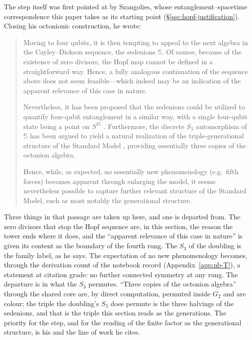 The step itself was first pointed at by Szangolies, whose entanglement--spacetime correspondence
this paper takes as its starting point (\S\ref{sec:hopf-justification}). Closing his octonionic
construction, he wrote:
\begin{quotation}
Moving to four qubits, it is then tempting to appeal to the next algebra in the Cayley--Dickson
sequence, the sedenions $\mathbb{S}$. Of course, because of the existence of zero divisors, the Hopf
map cannot be defined in a straightforward way. Hence, a fully analogous continuation of the
sequence above does not seem feasible---which indeed may be an indication of the apparent relevance
of this case in nature.

Nevertheless, it has been proposed that the sedenions could be utilized to quantify four-qubit
entanglement in a similar way, with a single four-qubit state being a point on $S^{31}$
\autocite{pinillaluthra2009hopf}. Furthermore, the discrete $S_{3}$ automorphism of $\mathbb{S}$ has
been argued to yield a natural realization of the triple-generational structure of the Standard
Model \autocite{gresnigtgourlayvarma2023three,gourlaygresnigt2024algebraic,tangtang2023unified},
providing essentially three copies of the octonion algebra.

Hence, while, as expected, no essentially new phenomenology (e.g.\ fifth forces) becomes apparent
through enlarging the model, it seems nevertheless possible to capture further relevant structure
of the Standard Model, such as most notably the generational structure.
\hfill \autocite[\S IV.E]{szangolies2025standardmodel}
\end{quotation}
Three things in that passage are taken up here, and one is departed from. The zero divisors that
stop the Hopf sequence are, in this section, the reason the tower ends where it does, and the
``apparent relevance of this case in nature'' is given its content as the boundary of the fourth
rung. The $S_{3}$ of the doubling is the family label, as he says. The expectation of no new
phenomenology becomes, through the derivation count of the notebook record
(Appendix~\ref{app:nb-T}), a statement at citation grade: no further connected symmetry at any
rung. The departure is in what the $S_{3}$ permutes. ``Three copies of the octonion algebra''
through the shared core are, by direct computation, permuted inside $G_{2}$ and are colour; the
triple the doubling's $S_{3}$ does permute is the three halvings of the sedenions, and that is the
triple this section reads as the generations. The priority for the step, and for the reading of
the finite factor as the generational structure, is his and the line of work he cites.

